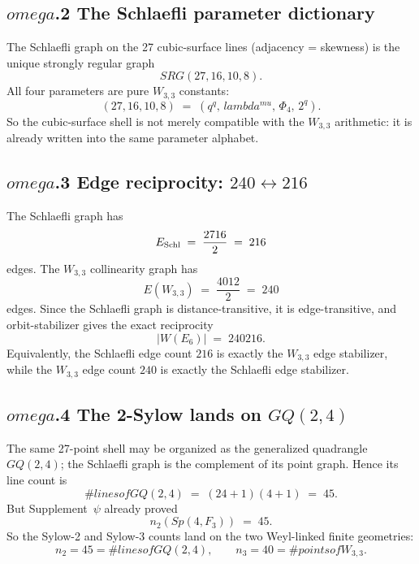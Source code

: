 \documentclass[12pt,a4paper]{article}
\def\mathbb#1{#1}%
\def\mathrm#1{#1}%
\def\text#1{#1}%
\def\omega{omega}%
\def\lambda{lambda}%
\def\mu{mu}%
\def\Phi#1{Phi#1}%
\def\cdot{ }%
\theoremstyle{definition}
\newcommand{\SRG}{\mathrm{SRG}}
\newcommand{\GQ}{\mathrm{GQ}}
\newcommand{\Sp}{\mathrm{Sp}}
\newcommand{\FF}{\mathbb{F}}
\begin{document}
\subsection*{$\omega$.2 \quad The Schlaefli parameter dictionary}
The Schlaefli graph on the 27 cubic-surface lines (adjacency = skewness)
is the unique strongly regular graph
\[
\SRG(27,16,10,8).
\]
All four parameters are pure $W_{3,3}$ constants:
\[
\boxed{\;(27,16,10,8) \;=\; (q^q,\,\lambda^{\mu},\,\Phi_4,\,2^q).\;}
\]
So the cubic-surface shell is not merely compatible with the
$W_{3,3}$ arithmetic: it is already written into the same parameter
alphabet.

\subsection*{$\omega$.3 \quad Edge reciprocity: $240 \leftrightarrow 216$}
The Schlaefli graph has
\[
E_{\rm Schl} \;=\; \frac{27\cdot 16}{2} \;=\; 216
\]
edges.  The $W_{3,3}$ collinearity graph has
\[
E(W_{3,3}) \;=\; \frac{40\cdot 12}{2} \;=\; 240
\]
edges.  Since the Schlaefli graph is distance-transitive, it is
edge-transitive, and orbit-stabilizer gives the exact reciprocity
\[
\boxed{\;|W(E_6)| \;=\; 240\cdot 216.\;}
\]
Equivalently, the Schlaefli edge count $216$ is exactly the
$W_{3,3}$ edge stabilizer, while the $W_{3,3}$ edge count $240$ is
exactly the Schlaefli edge stabilizer.

\subsection*{$\omega$.4 \quad The 2-Sylow lands on $\GQ(2,4)$}
The same 27-point shell may be organized as the generalized quadrangle
$\GQ(2,4)$; the Schlaefli graph is the complement of its point graph.
Hence its line count is
\[
\#\text{lines of }\GQ(2,4) \;=\; (2\cdot 4 + 1)(4+1) \;=\; 45.
\]
But Supplement~$\psi$ already proved
\[
n_2(\Sp(4,\FF_3)) \;=\; 45.
\]
So the Sylow-2 and Sylow-3 counts land on the two Weyl-linked finite
geometries:
\[
\boxed{\;n_2 = 45 = \#\text{lines of }\GQ(2,4),
\qquad
n_3 = 40 = \#\text{points of }W_{3,3}.\;}
\]
\end{document}

